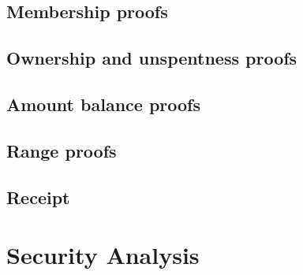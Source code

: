 \documentclass{article}
\begin{document}
\subsection{Membership proofs}

\subsection{Ownership and unspentness proofs}

\subsection{Amount balance proofs}

\subsection{Range proofs}

\subsection{Receipt}

\section{Security Analysis}



\end{document}
